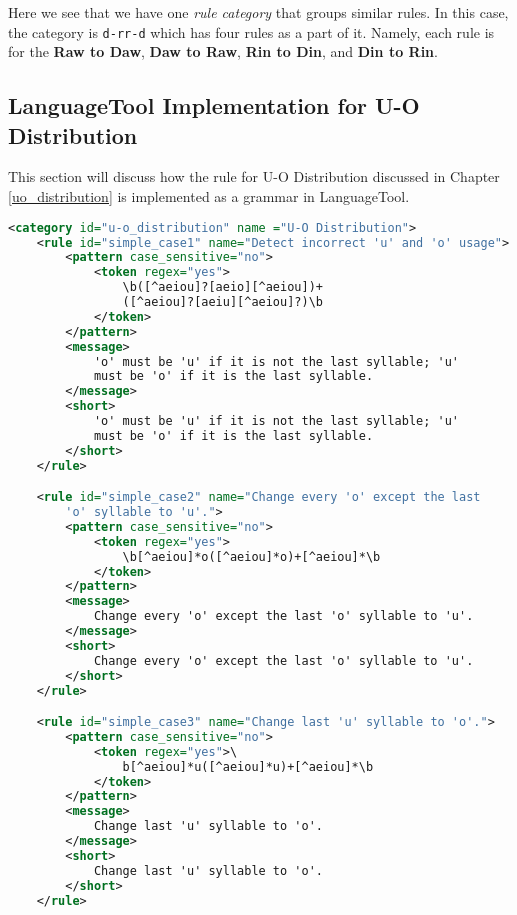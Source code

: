 Here we see that we have one \textit{rule category} that groups similar rules. In this case, the category is \texttt{d-r\textunderscore r-d} which has four rules as a part of it. Namely, each rule is for the \textbf{Raw to Daw}, \textbf{Daw to Raw}, \textbf{Rin to Din}, and \textbf{Din to Rin}.

\subsection{LanguageTool Implementation for U-O Distribution}

This section will discuss how the rule for U-O Distribution discussed in Chapter \ref{uo_distribution} is implemented as a grammar in LanguageTool.

\begin{lstlisting}[language= XML, caption=Grammar for U-O Distribution]
<category id="u-o_distribution" name ="U-O Distribution">
    <rule id="simple_case1" name="Detect incorrect 'u' and 'o' usage">
        <pattern case_sensitive="no"> 
            <token regex="yes">
                \b([^aeiou]?[aeio][^aeiou])+
                ([^aeiou]?[aeiu][^aeiou]?)\b
            </token>
        </pattern>
        <message>
            'o' must be 'u' if it is not the last syllable; 'u' 
            must be 'o' if it is the last syllable.
        </message>
        <short>
            'o' must be 'u' if it is not the last syllable; 'u' 
            must be 'o' if it is the last syllable.
        </short>
    </rule>

    <rule id="simple_case2" name="Change every 'o' except the last 
        'o' syllable to 'u'.">
        <pattern case_sensitive="no"> 
            <token regex="yes">
                \b[^aeiou]*o([^aeiou]*o)+[^aeiou]*\b
            </token>
        </pattern>
        <message>
            Change every 'o' except the last 'o' syllable to 'u'.
        </message>
        <short>
            Change every 'o' except the last 'o' syllable to 'u'.
        </short>
    </rule>

    <rule id="simple_case3" name="Change last 'u' syllable to 'o'.">
        <pattern case_sensitive="no"> 
            <token regex="yes">\
                b[^aeiou]*u([^aeiou]*u)+[^aeiou]*\b
            </token>
        </pattern>
        <message>
            Change last 'u' syllable to 'o'.
        </message>
        <short>
            Change last 'u' syllable to 'o'.
        </short>
    </rule>


\end{lstlisting}
